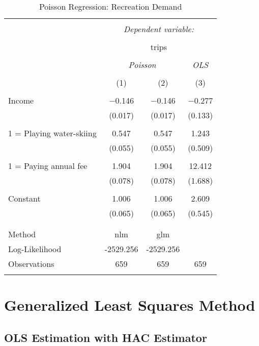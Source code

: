\documentclass[
  12pt,
]{article}
\begin{document}
\begin{table}[t] \centering 
  \caption{Poisson Regression: Recreation Demand} 
  \label{recreation} 
\begin{tabular}{@{\extracolsep{5pt}}lccc} 
\\[-1.8ex]\hline 
\hline \\[-1.8ex] 
 & \multicolumn{3}{c}{\textit{Dependent variable:}} \\ 
\cline{2-4} 
\\[-1.8ex] & \multicolumn{3}{c}{trips} \\ 
\\[-1.8ex] & \multicolumn{2}{c}{\textit{Poisson}} & \textit{OLS} \\ 
\\[-1.8ex] & (1) & (2) & (3)\\ 
\hline \\[-1.8ex] 
 Income & $-$0.146 & $-$0.146 & $-$0.277 \\ 
  & (0.017) & (0.017) & (0.133) \\ 
  & & & \\ 
 1 = Playing water-skiing & 0.547 & 0.547 & 1.243 \\ 
  & (0.055) & (0.055) & (0.509) \\ 
  & & & \\ 
 1 = Paying annual fee & 1.904 & 1.904 & 12.412 \\ 
  & (0.078) & (0.078) & (1.688) \\ 
  & & & \\ 
 Constant & 1.006 & 1.006 & 2.609 \\ 
  & (0.065) & (0.065) & (0.545) \\ 
  & & & \\ 
\hline \\[-1.8ex] 
Method & nlm & glm &  \\ 
Log-Likelihood & -2529.256 & -2529.256 &  \\ 
Observations & 659 & 659 & 659 \\ 
\hline 
\hline \\[-1.8ex] 
\end{tabular} 
\end{table}

\hypertarget{generalized-least-squares-method}{%
\section{Generalized Least Squares Method}\label{generalized-least-squares-method}}

\hypertarget{ols-estimation-with-hac-estimator}{%
\subsection{OLS Estimation with HAC Estimator}\label{ols-estimation-with-hac-estimator}}
\end{document}
